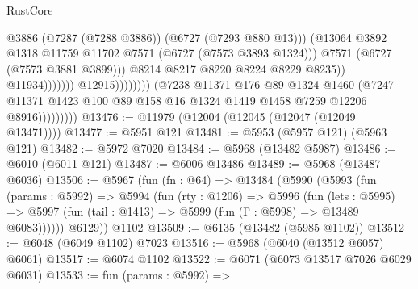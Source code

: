 \begin{lexlean}{RustCore}
\begin{coremodule}
                                                        @3886
                                                        (@7287 (@7288 @3886))
                                                        (@6727 (@7293 @880 @13)))
                                                      (@13064
                                                        @3892
                                                        @1318
                                                        @11759
                                                        @11702
                                                        @7571
                                                        (@6727 (@7573 @3893 @1324)))
                                                      @7571
                                                      (@6727 (@7573 @3881 @3899)))
                                                    @8214
                                                    @8217
                                                    @8220
                                                    @8224
                                                    @8229
                                                    @8235))
                                                @11934)))))))
                                  @12915))))))))
                  (@7238
                    @11371
                    @176
                    @89
                    @1324
                    @1460
                    (@7247
                      @11371
                      @1423
                      @100
                      @89
                      @158
                      @16
                      @1324
                      @1419
                      @1458
                      @7259
                      @12206
                      @8916)))))))))
@13476 := @11979 (@12004 (@12045 (@12047 (@12049 @13471))))
@13477 := @5951 @121
@13481 := @5953 (@5957 @121) (@5963 @121)
@13482 := @5972 @7020
@13484 := @5968 (@13482 @5987)
@13486 := @6010 (@6011 @121)
@13487 := @6006 @13486
@13489 := @5968 (@13487 @6036)
@13506 := @5967
    (fun (fn : @64) =>
    @13484
      (@5990
        (@5993
          (fun (params : @5992) =>
          @5994
            (fun (rty : @1206) =>
            @5996
              (fun (lets : @5995) =>
              @5997 (fun (tail : @1413) => @5999 (fun (Γ : @5998) => @13489 @6083))))))
        @6129))
    @1102
@13509 := @6135 (@13482 (@5985 @1102))
@13512 := @6048 (@6049 @1102) @7023
@13516 := @5968 (@6040 (@13512 @6057) @6061)
@13517 := @6074 @1102
@13522 := @6071 (@6073 @13517 @7026 @6029 @6031)
@13533 := fun (params : @5992) =>

\end{coremodule}
\end{lexlean}
